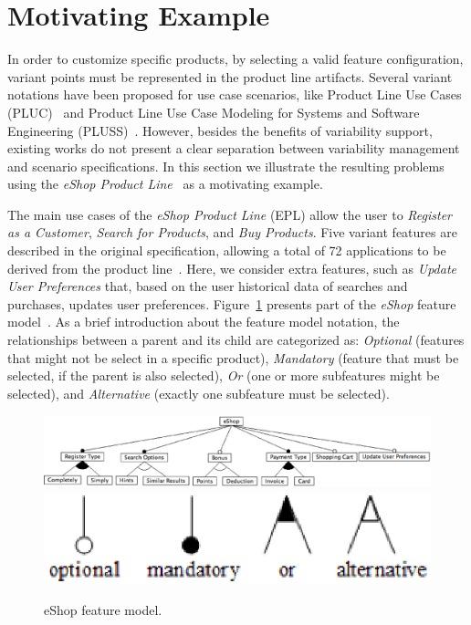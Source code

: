 \documentclass{acm_proc_article-sp}
\begin{document}
\section{Motivating Example}
\label{sec:example}

In order to customize specific products, by selecting a valid feature configuration, variant points must be represented in the 
product line artifacts. Several variant notations have been proposed for use case scenarios, like  Product Line Use Cases (PLUC)~\cite{bertolino-esec-2003} and Product Line Use Case Modeling for Systems and
Software Engineering (PLUSS)~\cite{eriksson-splc-2005}. However, besides
the benefits of variability support, existing works do not present a clear separation between variability 
management and scenario specifications. In this section we illustrate the resulting problems 
using the \emph{eShop Product Line}~\cite{eshop-url} as a motivating example. 

The main use cases of the \emph{eShop Product Line} (EPL) 
allow the user to \emph{Register as a Customer}, \emph{Search for Products}, 
and \emph{Buy Products}.  Five variant features are described in the original specification,
allowing a total  of 72 applications to be derived from the product line~\cite{eshop-url}. Here, 
we consider extra features, such as \emph{Update User Preferences} that, based on the user historical data of searches 
and purchases, updates user preferences. Figure~\ref{fig:eshop-fm} presents part of the \emph{eShop} feature model~\cite{gheyi-alloy-06,czarnecki-book,kang-foda-report}. 
As a brief introduction about the feature model notation, the relationships between a parent and its child are 
categorized as: \emph{Optional} (features that might not be select in a specific product), \emph{Mandatory} (feature that must be selected, if the parent is also 
selected), \emph{Or} (one or more subfeatures might be selected), and \emph{Alternative} (exactly one subfeature must be selected).     

 \begin{figure}[h]
 \begin{center}
  \includegraphics[scale=0.25]{img/eShop-fm3.eps}
   \includegraphics[scale=0.30]{img/fm-notation.eps}
  \caption{eShop feature model.}
  \label{fig:eshop-fm}
  \end{center}
\end{figure}
\end{document}
